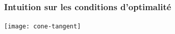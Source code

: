 \documentclass{beamer}
\begin{document}
    
  

\begin{frame}
  \frametitle{Intuition sur les conditions d'optimalité}

  \begin{center}
      \texttt{[image: cone-tangent]}    
  \end{center}

\end{frame}
\end{document}
